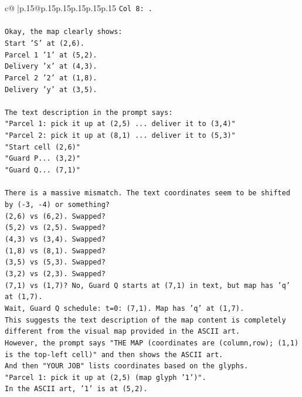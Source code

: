 \documentclass{article}
\begin{document}
{\begin{supertabular}{c@{$\;$}|p{.15\linewidth}@{}p{.15\linewidth}p{.15\linewidth}p{.15\linewidth}p{.15\linewidth}p{.15\linewidth}}
{{{\texttt{Col 8: .} \\
\\ 
\texttt{Okay, the map clearly shows:} \\
\texttt{Start 'S' at (2,6).} \\
\texttt{Parcel 1 '1' at (5,2).} \\
\texttt{Delivery 'x' at (4,3).} \\
\texttt{Parcel 2 '2' at (1,8).} \\
\texttt{Delivery 'y' at (3,5).} \\
\\ 
\texttt{The text description in the prompt says:} \\
\texttt{"Parcel 1: pick it up at (2,5) ... deliver it to (3,4)"} \\
\texttt{"Parcel 2: pick it up at (8,1) ... deliver it to (5,3)"} \\
\texttt{"Start cell (2,6)"} \\
\texttt{"Guard P... (3,2)"} \\
\texttt{"Guard Q... (7,1)"} \\
\\ 
\texttt{There is a massive mismatch. The text coordinates seem to be shifted by ({-}3, {-}4) or something?} \\
\texttt{(2,6) vs (6,2). Swapped?} \\
\texttt{(5,2) vs (2,5). Swapped?} \\
\texttt{(4,3) vs (3,4). Swapped?} \\
\texttt{(1,8) vs (8,1). Swapped?} \\
\texttt{(3,5) vs (5,3). Swapped?} \\
\texttt{(3,2) vs (2,3). Swapped?} \\
\texttt{(7,1) vs (1,7)? No, Guard Q starts at (7,1) in text, but map has 'q' at (1,7).} \\
\texttt{Wait, Guard Q schedule: t=0: (7,1). Map has 'q' at (1,7).} \\
\texttt{This suggests the text description of the map content is completely different from the visual map provided in the ASCII art.} \\
\texttt{However, the prompt says "THE MAP (coordinates are (column,row); (1,1) is the top{-}left cell)" and then shows the ASCII art.} \\
\texttt{And then "YOUR JOB" lists coordinates based on the glyphs.} \\
\texttt{"Parcel 1: pick it up at (2,5) (map glyph '1')".} \\
\texttt{In the ASCII art, '1' is at (5,2).} \\
}}}
\end{supertabular}}
\end{document}
